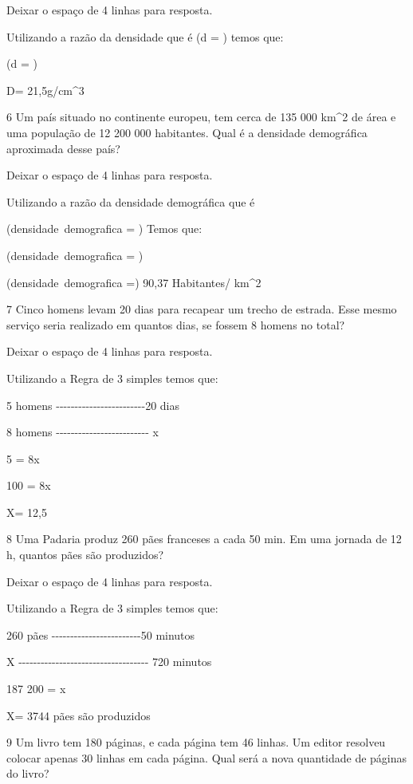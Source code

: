 Deixar o espaço de 4 linhas para resposta.

Utilizando a razão da densidade que é (d = ) temos que:

(d = )

D= 21,5g/cm^3

\num{6} Um país situado no continente europeu, tem cerca de 135 000 km^2 de
área e uma população de 12 200 000 habitantes. Qual é a densidade
demográfica aproximada desse país?

Deixar o espaço de 4 linhas para resposta.

Utilizando a razão da densidade demográfica que é

(densidade\ demografica = )
Temos que:

(densidade\ demografica = )

(densidade\ demografica =) 90,37 Habitantes/ km^2

\num{7} Cinco homens levam 20 dias para recapear um trecho de estrada. Esse
mesmo serviço seria realizado em quantos dias, se fossem 8 homens no
total?

Deixar o espaço de 4 linhas para resposta.

Utilizando a Regra de 3 simples temos que:

5 homens
-\/-\/-\/-\/-\/-\/-\/-\/-\/-\/-\/-\/-\/-\/-\/-\/-\/-\/-\/-\/-\/-\/-\/-20
dias

8 homens
-\/-\/-\/-\/-\/-\/-\/-\/-\/-\/-\/-\/-\/-\/-\/-\/-\/-\/-\/-\/-\/-\/-\/-\/-
x

5 = 8\times x

100 = 8x

X= 12,5

\num{8} Uma Padaria produz 260 pães franceses a cada 50 min. Em uma jornada
de 12 h, quantos pães são produzidos?

Deixar o espaço de 4 linhas para resposta.

Utilizando a Regra de 3 simples temos que:

260 pães
-\/-\/-\/-\/-\/-\/-\/-\/-\/-\/-\/-\/-\/-\/-\/-\/-\/-\/-\/-\/-\/-\/-\/-50
minutos

X
-\/-\/-\/-\/-\/-\/-\/-\/-\/-\/-\/-\/-\/-\/-\/-\/-\/-\/-\/-\/-\/-\/-\/-\/-\/-\/-\/-\/-\/-\/-\/-\/-\/-\/-
720 minutos

187 200 = x

X= 3744 pães são produzidos

\num{9} Um livro tem 180 páginas, e cada página tem 46 linhas. Um editor
resolveu colocar apenas 30 linhas em cada página. Qual será a nova
quantidade de páginas do livro?

